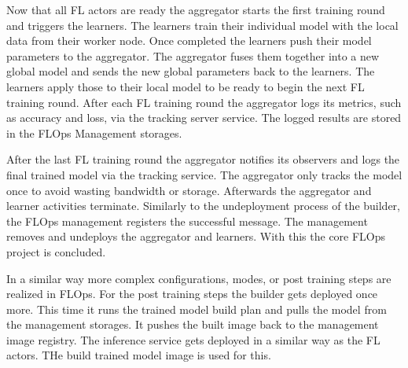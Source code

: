 Now that all FL actors are ready the aggregator starts the first training round and triggers the learners.
The learners train their individual model with the local data from their worker node.
Once completed the learners push their model parameters to the aggregator.
The aggregator fuses them together into a new global model and sends the new global parameters back to the learners.
The learners apply those to their local model to be ready to begin the next FL training round.
After each FL training round the aggregator logs its metrics, such as accuracy and loss, via the tracking server service.
The logged results are stored in the FLOps Management storages.

After the last FL training round the aggregator notifies its observers and logs the final trained model via the tracking service.
The aggregator only tracks the model once to avoid wasting bandwidth or storage.
Afterwards the aggregator and learner activities terminate.
Similarly to the undeployment process of the builder, the FLOps management registers the successful message.
The management removes and undeploys the aggregator and learners.
With this the core FLOps project is concluded.

In a similar way more complex configurations, modes, or post training steps are realized in FLOps.
For the post training steps the builder gets deployed once more.
This time it runs the trained model build plan and pulls the model from the management storages.
It pushes the built image back to the management image registry.
The inference service gets deployed in a similar way as the FL actors.
THe build trained model image is used for this.





